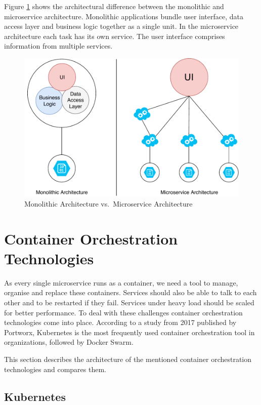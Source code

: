 Figure \ref{monolithic_vs_microservice} shows the architectural
difference between the monolithic and microservice architecture.
Monolithic applications bundle user interface, data access layer and
business logic together as a single unit. In the microservice
architecture each task has its own service. The user interface comprises
information from multiple services.

\begin{figure}
\centering
\includegraphics[width=15.00000cm]{images/monolithic_vs_microservice}
\caption{Monolithic Architecture vs.~Microservice Architecture
\label{monolithic_vs_microservice}}
\end{figure}

\section{Container Orchestration
Technologies}\label{container-orchestration-technologies}

As every single microservice runs as a container, we need a tool to
manage, organise and replace these containers. Services should also be
able to talk to each other and to be restarted if they fail. Services
under heavy load should be scaled for better performance. To deal with
these challenges container orchestration technologies come into place.
According to a study from 2017 published by Portworx, Kubernetes is the
most frequently used container orchestration tool in organizations,
followed by Docker Swarm. \cite{portworx-2017}

This section describes the architecture of the mentioned container
orchestration technologies and compares them.

\subsection{Kubernetes}\label{kubernetes}

